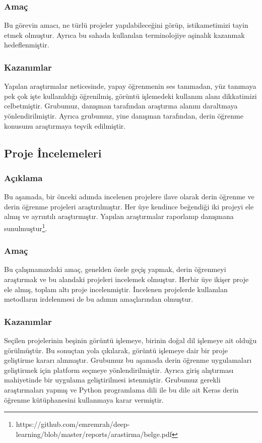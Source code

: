 \documentclass[12pt,a4paper]{article}
\begin{document}
    \subsubsection{Amaç}
    Bu görevin amacı, ne türlü projeler yapılabileceğini görüp, istikametimizi tayin etmek olmuştur. 
    Ayrıca bu sahada kullanılan terminolojiye aşinalık kazanmak hedeflenmiştir.

    \subsubsection{Kazanımlar}
    Yapılan araştırmalar neticesinde, yapay öğrenmenin ses tanımadan, yüz tanımaya pek çok işte kullanıldığı öğrenilmiş,
     görüntü işlemedeki kullanım alanı dikkatimizi celbetmiştir. Grubumuz, danışman tarafından araştırma alanını
     daraltmaya yönlendirilmiştir. Ayrıca grubumuz, yine danışman tarafından, derin öğrenme konusunu araştırmaya teşvik edilmiştir.

    \subsection{Proje İncelemeleri}
    \subsubsection{Açıklama}
    Bu aşamada, bir önceki adımda incelenen projelere ilave olarak derin öğrenme ve derin öğrenme projeleri araştırılmıştır. Her üye kendince beğendiği iki projeyi ele almış
    ve ayrıntılı araştırmıştır. Yapılan araştırmalar raporlanıp danışmana sunulmuştur\footnote{https://github.com/emremrah/deep-learning/blob/master/reports/arastirma/belge.pdf}.

    \subsubsection{Amaç}
    Bu çalışmamızdaki amaç, genelden özele geçiş yapmak, derin öğrenmeyi araştırmak ve bu alandaki projeleri incelemek olmuştur. Herbir üye ikişer proje ele almış, toplam altı proje incelenmiştir. 
    İncelenen projelerde kullanılan metodların irdelenmesi de bu adımın amaçlarından olmuştur.

    \subsubsection{Kazanımlar}
    Seçilen projelerinin beşinin görüntü işlemeye, birinin doğal dil işlemeye ait olduğu görülmüştür. Bu sonuçtan yola çıkılarak, görüntü işlemeye dair bir proje geliştirme kararı alınmıştır.
    Grubumuz bu aşamada derin öğrenme uygulamaları geliştirmek için platform seçmeye yönlendirilmiştir. Ayrıca giriş alıştırması mahiyetinde bir uygulama geliştirilmesi istenmiştir.
    Grubumuz gerekli araştırmaları yapmış ve Python programlama dili ile bu dile ait Keras derin öğrenme kütüphanesini kullanmaya karar vermiştir.
\end{document}
